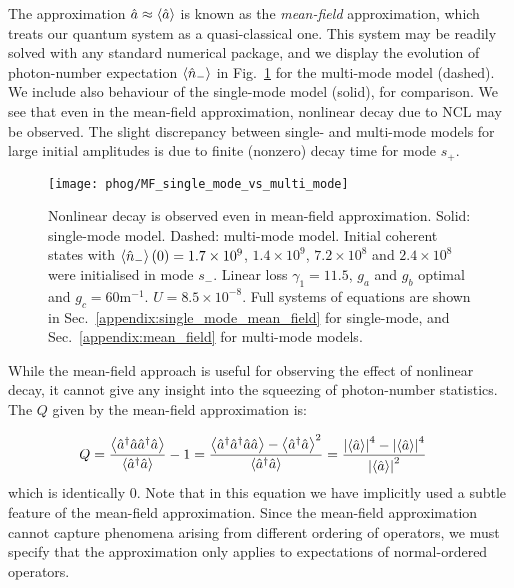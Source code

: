 The approximation $\hat{a} \approx \ev{\hat{a}}$ is known as the \emph{mean-field} approximation, which treats our quantum system as a quasi-classical one. This system may be readily solved with any standard numerical package, and we display the evolution of photon-number expectation $\ev{\hat{n}_-}$ in Fig.~\ref{fig:phog_MF_demonstration} for the multi-mode model (dashed). We include also behaviour of the single-mode model (solid), for comparison. We see that even in the mean-field approximation, nonlinear decay due to NCL may be observed. The slight discrepancy between single- and multi-mode models for large initial amplitudes is due to finite (nonzero) decay time for mode $s_+$.


\begin{figure}[htp]
\captionsetup{width=0.8\linewidth}
\centering
\texttt{[image: phog/MF\_single\_mode\_vs\_multi\_mode]}
\caption{\label{fig:phog_MF_demonstration} Nonlinear decay is observed even in mean-field approximation. Solid: single-mode model. Dashed: multi-mode model. Initial coherent states with $\ev{\hat{n}_-}\left(0\right) = 1.7\times 10^9$, $1.4\times10^9$, $7.2\times10^8$ and $2.4\times10^8$ were initialised in mode $s_-$. Linear loss $\gamma_1 = 11.5$, $g_a$ and $g_b$ optimal and $g_c = 60$m$^{-1}$. $U = 8.5\times10^{-8}$. Full systems of equations are shown in Sec.~\ref{appendix:single_mode_mean_field} for single-mode, and Sec.~\ref{appendix:mean_field} for multi-mode models.}
\end{figure}


While the mean-field approach is useful for observing the effect of nonlinear decay, it cannot give any insight into the squeezing of photon-number statistics. The $Q$ given by the mean-field approximation is:

\begin{align}
Q = \frac{\ev{\hat{a}^\dagger \hat{a} \hat{a}^\dagger \hat{a}}}{\ev{\hat{a}^\dagger \hat{a}}} - 1 &= \frac{\ev{\hat{a}^\dagger \hat{a}^\dagger \hat{a} \hat{a}} - \ev{\hat{a}^\dagger \hat{a}}^2}{\ev{\hat{a}^\dagger \hat{a}}} = \frac{\left|\ev{\hat{a}}\right|^4 - \left|\ev{\hat{a}}\right|^4}{\left|\ev{\hat{a}}\right|^2} \notag
\end{align}
which is identically $0$. Note that in this equation we have implicitly used a subtle feature of the mean-field approximation. Since the mean-field approximation cannot capture phenomena arising from different ordering of operators, we must specify that the approximation only applies to expectations of normal-ordered operators.

